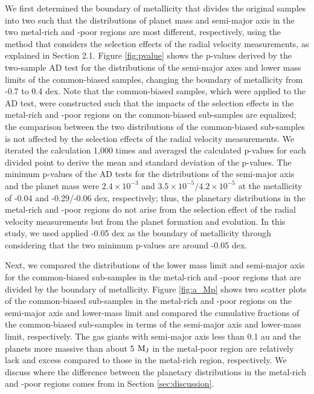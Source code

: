 \documentclass[twocolumn, dvipdfmx]{aastex62}
\begin{document}
\begin{CJK*}{UTF8}{min}
We first determined the boundary of metallicity that divides the original samples into two such that the distributions of planet mass and semi-major axis in the two metal-rich and -poor regions are most different, respectively, using the method that considers the selection effects of the radial velocity measurements, as explained in Section 2.1. Figure \ref{fig:pvalue} shows the p-values derived by the two-sample AD test for the distributions of the semi-major axes and lower mass limits of the common-biased samples, changing the boundary of metallicity from -0.7 to 0.4 dex. Note that the common-biased samples, which were applied to the AD test, were constructed such that the impacts of the selection effects in the metal-rich and -poor regions on the common-biased sub-samples are equalized; the comparison between the two distributions of the common-biased sub-samples is not affected by the selection effects of the radial velocity measurements. We iterated the calculation 1,000 times and averaged the calculated p-values for each divided point to derive the mean and standard deviation of the p-values. The minimum p-values of the AD tests for the distributions of the semi-major axis and the planet mass were $2.4\times10^{-3}$ and $3.5\times10^{-5}/4.2\times10^{-5}$ at the metallicity of -0.04 and -0.29/-0.06 dex, respectively; thus, the planetary distributions in the metal-rich and -poor regions do not arise from the selection effect of the radial velocity measurements but from the planet formation and evolution. In this study, we used applied -0.05 dex as the boundary of metallicity through considering that the two minimum p-values are around -0.05 dex.

Next, we compared the distributions of the lower mass limit and semi-major axis for the common-biased sub-samples in the metal-rich and -poor regions that are divided by the boundary of metallicity. Figure \ref{fig:a_Mp} shows two scatter plots of the common-biased sub-samples in the metal-rich and -poor regions on the semi-major axis and lower-mass limit and compared the cumulative fractions of the common-biased sub-samples in terms of the semi-major axis and lower-mass limit, respectively. The gas giants with semi-major axis less than 0.1 au and the planets more massive than about 5 $\rm M_J$ in the metal-poor region are relatively lack and excess compared to those in the metal-rich region, respectively. We discuss where the difference between the planetary distributions in the metal-rich and -poor regions comes from in Section \ref{sec:discussion}.


\end{CJK*}
\end{document}
